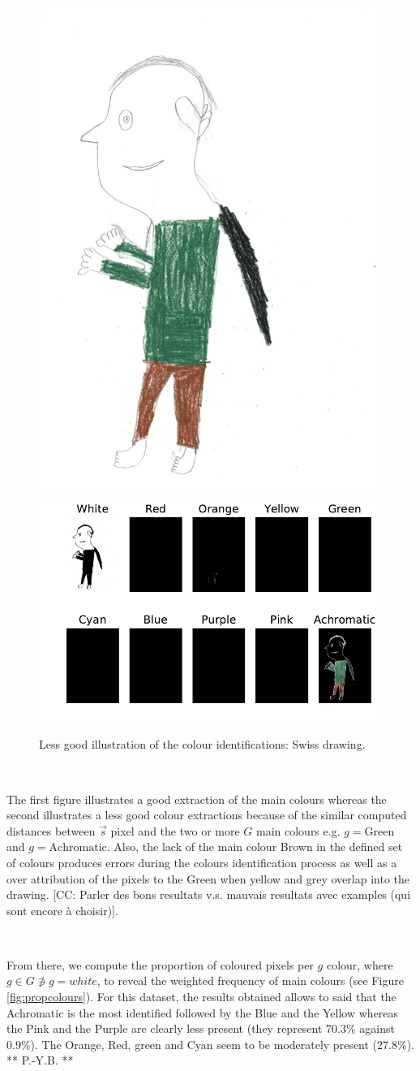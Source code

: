 \documentclass[11pt,a4paper]{article}
\begin{document}
\begin{figure}[h!]
	\centering
	\includegraphics[width=0.32\linewidth]{figures/ch15_fr_m_rrs_08_08_fim-r.jpg}
	\includegraphics[width=0.62\linewidth]{figures/ch15_fr_m_rrs_08_08_fim-rno_filter_mask.pdf}
	\caption{Less good illustration of the colour identifications: Swiss drawing.}
	\label{fig:example2}
\end{figure}

\

The first figure illustrates a good extraction of the main colours whereas the second illustrates a less good colour extractions because of the similar computed distances between $\vec{s}$  pixel and the two or more $G$ main colours e.g. $g = \mbox{Green}$ and $g = \mbox{Achromatic}$. 
Also, the lack of the main colour  Brown in the defined set of colours produces errors during the colours identification process as well as a over attribution of the pixels to the Green when yellow and grey overlap into the drawing. 
{\color{red}[CC:  Parler des bons resultats v.s. mauvais resultats avec examples (qui sont encore \`a choisir)]}.

\

From there, we compute the proportion of coloured pixels per $g$ colour, where $g \in G \not\ni g = white$, to reveal the weighted frequency of main colours (see Figure \ref{fig:propcolours}). 
For this dataset, the results obtained allows to said that the Achromatic is the most identified followed by the Blue and the Yellow whereas the Pink and the Purple are clearly less present (they represent $70.3\%$ against $0.9\%$). The Orange, Red, green and Cyan seem to be moderately present ($27.8\%$). 
{\color{red} ** P.-Y.B. **}
\end{document}
